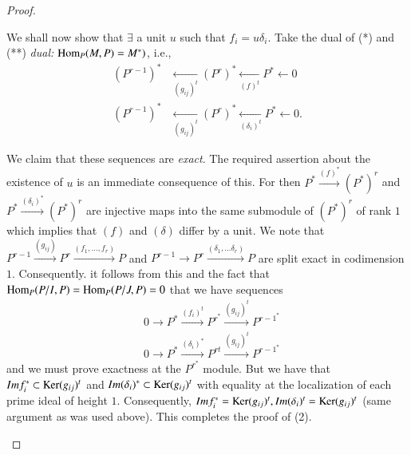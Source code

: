 {\begin{proof}
\begin{enumerate}[(1)]
We shall now show that $\exists$ a unit $u$ such that
$f_i=u\delta_i$. Take the dual of (*) and (**) {\em dual:}
$\operatorname{Hom}_P(M,P)=M^{\ast})$, i.e., 
\begin{align*}
(P^{r-1})^{\ast}&\xleftarrow[(g_{ij})^{t}]\quad
(P^{r})^{\ast}\xleftarrow[(f)^{t}] \quad P^{\ast}\leftarrow
0 \tag*{$(*)^*$}\\ 
(P^{r-1})^{\ast}&\xleftarrow[(g_{ij})^{t}]\quad
(P^{r})^{\ast}\xleftarrow[(\delta_i)^{t}] \quad P^{\ast}\leftarrow
0. \tag*{$(**)^*$} 
\end{align*}

We claim that these sequences are {\em exact}. The required assertion
about the existence of $u$ is an immediate consequence of this. For
then $P^{\ast}\xrightarrow{(f)^{\ast}}(P^{\ast})^{r}$ and
$P^{\ast}\xrightarrow{(\delta_{i})^{\ast}}(P^{\ast})^{r}$ are
injective maps into the same submodule of $(P^{\ast})^{r}$ of  rank
$1$ which implies that $(f)$ and $(\delta)$ differ by a unit. We note
that $P^{r-1}\xrightarrow{(g_{ij})}
P^{r}\xrightarrow{(f_1,\ldots,f_r)}P$ and $P^{r-1}\to
P^{r}\xrightarrow{(\delta_{1},\ldots\delta_{r})}P$ are split exact in
codimension $1$. Consequently. it follows from this and the fact that
$\operatorname{Hom}_P(P/I, P)=\operatorname{Hom}_P(P/J, P)=0$ that we have sequences 
\begin{align*}
&0\to P^{\ast}\xrightarrow{(f_i)^{t}}P^{r^{\ast}}\xrightarrow{(g_{ij})^{t}}P^{r-1^{\ast}}\\
&0\to P^{\ast}\xrightarrow{(\delta_{i})^{\ast}}P^{rt}\xrightarrow{(g_{ij})^{t}}P^{r-1^{\ast}}
\end{align*}\pageoriginale 
and we must prove exactness at the $P^{r^{\ast}}$ module. But we have
that $Im f_{i}^{\ast}\subset \operatorname{Ker}(g_{ij})^{t}$ and
$Im(\delta_i)^{\ast}\subset \operatorname{Ker} (g_{ij})^{t}$ with equality at the
localization of each prime ideal of height $1$. Consequently, $Im
f_{i}^{\ast}=\operatorname{Ker}(g_{ij})^{t}, Im(\delta_{i})^{t}=\operatorname{Ker}(g_{ij})^{t}$
(same argument as was used above). This completes the proof of (2). 


\end{enumerate}
\end{proof}}
